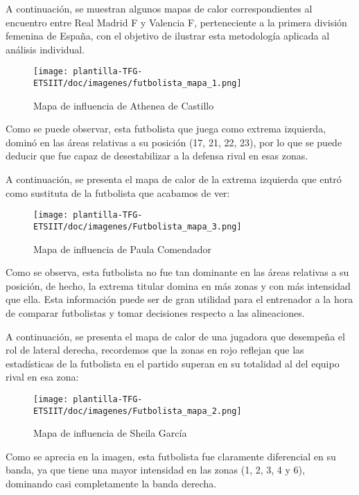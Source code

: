 A continuación, se muestran algunos mapas de calor correspondientes al encuentro entre Real Madrid F y Valencia F, perteneciente a la primera división femenina de España, con el objetivo de ilustrar esta metodología aplicada al análisis individual.

\begin{figure}[H]
    \centering
    \texttt{[image: plantilla-TFG-ETSIIT/doc/imagenes/futbolista\_mapa\_1.png]}
    \caption{Mapa de influencia de Athenea de Castillo}
    \label{fig:etiqueta-imagen}
\end{figure}

Como se puede observar, esta futbolista que juega como extrema izquierda, dominó en las áreas relativas a su posición (17, 21, 22, 23), por lo que se puede deducir que fue capaz de desestabilizar a la defensa rival en esas zonas.

A continuación, se presenta el mapa de calor de la extrema izquierda que entró como sustituta de la futbolista que acabamos de ver:

\begin{figure}[H]
    \centering
    \texttt{[image: plantilla-TFG-ETSIIT/doc/imagenes/Futbolista\_mapa\_3.png]}
    \caption{Mapa de influencia de Paula Comendador}
    \label{fig:etiqueta-imagen}
\end{figure}

Como se observa, esta futbolista no fue tan dominante en las áreas relativas a su posición, de hecho, la extrema titular domina en más zonas y con más intensidad que ella. Esta información puede ser de gran utilidad para el entrenador a la hora de comparar futbolistas y tomar decisiones respecto a las alineaciones.

A continuación, se presenta el mapa de calor de una jugadora que desempeña el rol de lateral derecha, recordemos que la zonas en rojo reflejan que las estadísticas de la futbolista en el partido superan en su totalidad al del equipo rival en esa zona:

\begin{figure}[H]
    \centering
    \texttt{[image: plantilla-TFG-ETSIIT/doc/imagenes/Futbolista\_mapa\_2.png]}
    \caption{Mapa de influencia de Sheila García}
    \label{fig:etiqueta-imagen}
\end{figure}

Como se aprecia en la imagen, esta futbolista fue claramente diferencial en su banda, ya que tiene una mayor intensidad en las zonas (1, 2, 3, 4 y 6), dominando casi completamente la banda derecha.

